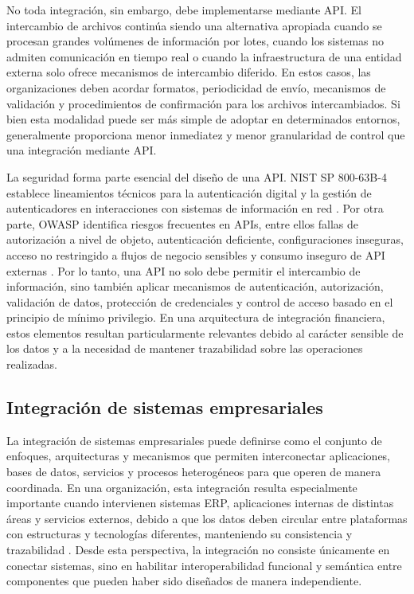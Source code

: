 No toda integración, sin embargo, debe implementarse mediante API. El intercambio de archivos continúa siendo una alternativa apropiada cuando se procesan grandes volúmenes de información por lotes, cuando los sistemas no admiten comunicación en tiempo real o cuando la infraestructura de una entidad externa solo ofrece mecanismos de intercambio diferido. En estos casos, las organizaciones deben acordar formatos, periodicidad de envío, mecanismos de validación y procedimientos de confirmación para los archivos intercambiados. Si bien esta modalidad puede ser más simple de adoptar en determinados entornos, generalmente proporciona menor inmediatez y menor granularidad de control que una integración mediante API.

La seguridad forma parte esencial del diseño de una API. NIST SP 800-63B-4 establece lineamientos técnicos para la autenticación digital y la gestión de autenticadores en interacciones con sistemas de información en red \citep{nist2025}. Por otra parte, OWASP identifica riesgos frecuentes en APIs, entre ellos fallas de autorización a nivel de objeto, autenticación deficiente, configuraciones inseguras, acceso no restringido a flujos de negocio sensibles y consumo inseguro de API externas \citep{owasp2023}. Por lo tanto, una API no solo debe permitir el intercambio de información, sino también aplicar mecanismos de autenticación, autorización, validación de datos, protección de credenciales y control de acceso basado en el principio de mínimo privilegio. En una arquitectura de integración financiera, estos elementos resultan particularmente relevantes debido al carácter sensible de los datos y a la necesidad de mantener trazabilidad sobre las operaciones realizadas.

\subsection{Integración de sistemas empresariales}

La integración de sistemas empresariales puede definirse como el conjunto de enfoques, arquitecturas y mecanismos que permiten interconectar aplicaciones, bases de datos, servicios y procesos heterogéneos para que operen de manera coordinada. En una organización, esta integración resulta especialmente importante cuando intervienen sistemas ERP, aplicaciones internas de distintas áreas y servicios externos, debido a que los datos deben circular entre plataformas con estructuras y tecnologías diferentes, manteniendo su consistencia y trazabilidad \citep{hohpe2003}. Desde esta perspectiva, la integración no consiste únicamente en conectar sistemas, sino en habilitar interoperabilidad funcional y semántica entre componentes que pueden haber sido diseñados de manera independiente.

